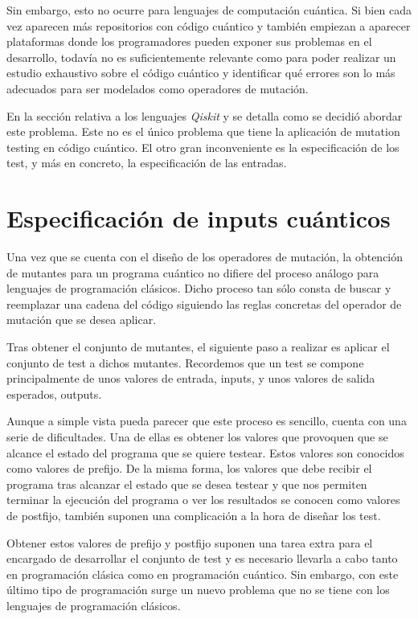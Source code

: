 Sin embargo, esto no ocurre para lenguajes de computación cuántica. Si bien cada vez aparecen más repositorios con código cuántico y también empiezan a aparecer  plataformas donde los programadores pueden exponer sus problemas en el desarrollo, todavía no es suficientemente relevante como para poder realizar un estudio exhaustivo sobre el código cuántico y identificar qué errores son lo más adecuados para ser modelados como operadores de mutación.

En la sección relativa a los lenguajes \textit{Qiskit} y \qsh se detalla como se decidió abordar este problema. Este no es el único problema que tiene la aplicación de mutation testing en código cuántico. El otro gran inconveniente es la especificación de los test, y más en concreto, la especificación de las entradas.

\section{Especificación de inputs cuánticos}

Una vez que se cuenta con el diseño de los operadores de mutación, la obtención de mutantes para un programa cuántico no difiere del proceso análogo para lenguajes de programación clásicos. Dicho proceso tan sólo consta de buscar y reemplazar una cadena del código siguiendo las reglas concretas del operador de mutación que se desea aplicar.

Tras obtener el conjunto de mutantes, el siguiente paso a realizar es aplicar el conjunto de test a dichos mutantes. Recordemos que un test se compone principalmente de unos valores de entrada, inputs, y unos valores de salida esperados, outputs. 

Aunque a simple vista pueda parecer que este proceso es sencillo, cuenta con una serie de dificultades. Una de ellas es obtener los valores que provoquen que se alcance el estado del programa que se quiere testear. Estos valores son conocidos como valores de prefijo. De la misma forma, los valores que debe recibir el programa tras alcanzar el estado que se desea testear y que nos permiten terminar la ejecución del programa o ver los resultados se conocen como valores de postfijo, también suponen una complicación a la hora de diseñar los test.

Obtener estos valores de prefijo y postfijo suponen una tarea extra para el encargado de desarrollar el conjunto de test y es necesario llevarla a cabo tanto en programación clásica como en programación cuántico. Sin embargo, con este último tipo de programación surge un nuevo problema que no se tiene con los lenguajes de programación clásicos.

